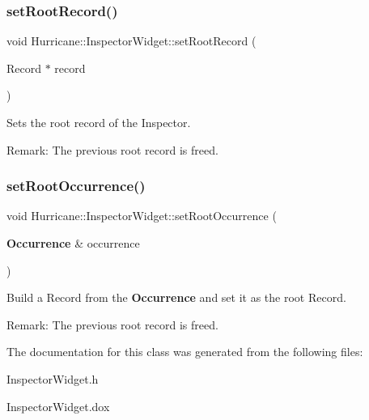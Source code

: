 \subsubsection{\texorpdfstring{set\+Root\+Record()}{setRootRecord()}}
{\footnotesize\ttfamily void Hurricane\+::\+Inspector\+Widget\+::set\+Root\+Record (\begin{DoxyParamCaption}\item[{Record $\ast$}]{record }\end{DoxyParamCaption})}

Sets the root record of the Inspector.

\begin{DoxyParagraph}{Remark\+: The previous root record is freed.}

\end{DoxyParagraph}
\mbox{\label{classHurricane_1_1InspectorWidget_a79914005284bdc8426c90f3440714bb4}} 
\subsubsection{\texorpdfstring{set\+Root\+Occurrence()}{setRootOccurrence()}}
{\footnotesize\ttfamily void Hurricane\+::\+Inspector\+Widget\+::set\+Root\+Occurrence (\begin{DoxyParamCaption}\item[{\textbf{ Occurrence} \&}]{occurrence }\end{DoxyParamCaption})}

Build a Record from the \textbf{ Occurrence} and set it as the root Record.

\begin{DoxyParagraph}{Remark\+: The previous root record is freed.}

\end{DoxyParagraph}


The documentation for this class was generated from the following files\+:\begin{DoxyCompactItemize}
\item 
Inspector\+Widget.\+h\item 
Inspector\+Widget.\+dox\end{DoxyCompactItemize}
